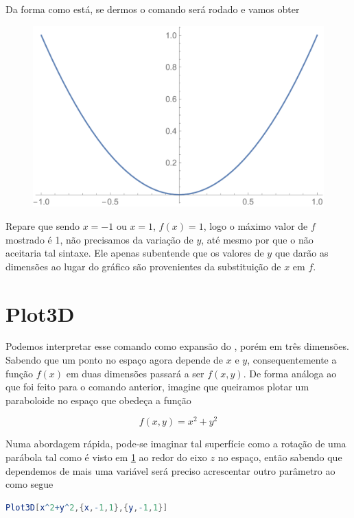\documentclass[a4paper, 12pt]{article}
\begin{document}
	Da forma como está, se dermos  o comando será rodado e vamos obter
	
	\begin{figure}[!h]\label{parabola}
		\centering
		\includegraphics[scale=.5]{images/parabola}
	\end{figure}

	Repare que sendo $x=-1$ ou $x=1$, $f(x)=1$, logo o máximo valor de $f$ mostrado é 1, não precisamos da variação de $y$, até mesmo por que o  não aceitaria tal sintaxe. Ele apenas subentende que os valores de $y$ que darão as dimensões ao lugar do gráfico são provenientes da substituição de $x$ em $f$.
	
	\section{Plot3D}
	Podemos interpretar esse comando como expansão do , porém em três dimensões. Sabendo que um ponto no espaço agora depende de $x$ e $y$, consequentemente a função $f(x)$ em duas dimensões passará a ser $f(x,y)$. De forma análoga ao que foi feito para o comando anterior, imagine que queiramos plotar um paraboloide no espaço que obedeça a função
	
	\begin{equation}
		f(x,y)=x^2+y^2
	\end{equation}
	
	Numa abordagem rápida, pode-se imaginar tal superfície como a rotação de uma parábola tal como é visto em \ref{parabola} ao redor do eixo $z$ no espaço, então sabendo que dependemos de mais uma variável será preciso acrescentar outro parâmetro ao  como segue
	
\begin{lstlisting}[language=Mathematica]
Plot3D[x^2+y^2,{x,-1,1},{y,-1,1}]
\end{lstlisting}
	
\end{document}
